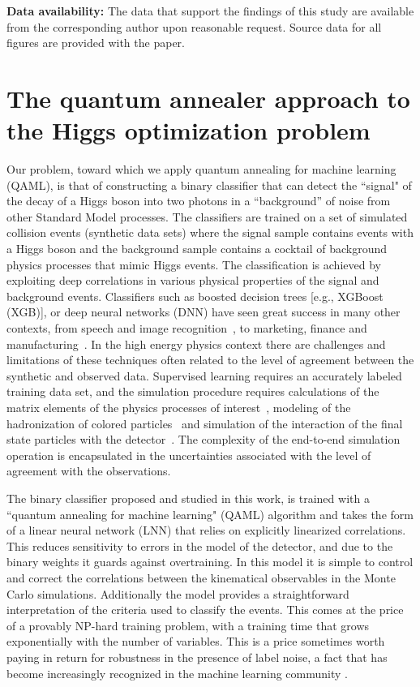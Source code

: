 \documentclass[fleqn,10pt]{wlscirep}
\begin{document}
\textbf{Data availability:} The data that support the findings of this study are available from the corresponding
author upon reasonable request. Source data for all figures are provided with the paper.

 
\section*{The quantum annealer approach to the Higgs optimization problem}

Our problem, toward which we apply quantum annealing for machine learning (QAML), is that of constructing a binary classifier that can detect the ``signal" of the decay of a Higgs boson into two photons in a ``background'' of noise from other Standard Model processes. The classifiers are trained on a set of simulated collision events 
 (synthetic data sets) where the signal sample contains events with a Higgs boson and the background sample 
 contains a cocktail of background physics processes that mimic Higgs events. The classification is  achieved 
 by exploiting deep correlations in various physical properties of the signal and background events.   
 Classifiers such as boosted decision trees [e.g.,  XGBoost (XGB)], or deep neural networks (DNN) have seen great 
 success in many other contexts, from speech and image recognition~\cite{Le:2013}, to marketing, finance and 
 manufacturing~\cite{BigDataMarketing:2015}. In the high energy physics context there are challenges and limitations 
 of these  techniques often related to the level of agreement between the synthetic and observed data. Supervised 
 learning requires an accurately labeled training data set, and the simulation procedure requires calculations of the 
 matrix elements of the physics processes of interest~\cite{Alwall:2014hca}, modeling of the hadronization of colored 
 particles~\cite{Sjostrand:2006za} and simulation of the interaction of the final state particles with the detector~\cite{Agostinelli:2002hh}.  
The complexity of the end-to-end simulation operation is encapsulated in the uncertainties associated with the level of agreement with the observations.

The binary classifier proposed and studied in this work, is trained with a ``quantum annealing for machine learning" (QAML) algorithm \cite{Neven1,Pudenz:2013kx}   and takes  the form of a  linear neural network (LNN) that relies on explicitly linearized  correlations. This  reduces sensitivity to errors in the model of  the detector, and due to the binary weights  it guards against overtraining.  In this model it is simple to control and correct the correlations  between the kinematical observables in the Monte Carlo simulations. Additionally the model provides a straightforward interpretation  of the criteria used to classify the events. This comes at the price of a provably NP-hard training problem, with a training time  that grows exponentially with the number of variables.  This is a price sometimes worth paying in return for robustness in the presence of label noise, a fact that has become increasingly recognized in the machine learning community \cite{Long:2010fj,Manwani:2013qv,ICML2012Denchev_461}. 
\end{document}
